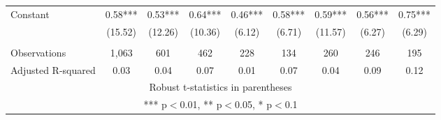 \documentclass[]{article}
\begin{document}
\begin{tabular}{lcccccccc}
Constant & 0.58*** & 0.53*** & 0.64*** & 0.46*** & 0.58*** & 0.59*** & 0.56*** & 0.75*** \\
 & (15.52) & (12.26) & (10.36) & (6.12) & (6.71) & (11.57) & (6.27) & (6.29) \\
 &  &  &  &  &  &  &  &  \\
Observations & 1,063 & 601 & 462 & 228 & 134 & 260 & 246 & 195 \\
 Adjusted R-squared & 0.03 & 0.04 & 0.07 & 0.01 & 0.07 & 0.04 & 0.09 & 0.12 \\ \hline
\multicolumn{9}{c}{ Robust t-statistics in parentheses} \\
\multicolumn{9}{c}{ *** p$<$0.01, ** p$<$0.05, * p$<$0.1} \\
\end{tabular}
\end{document}
